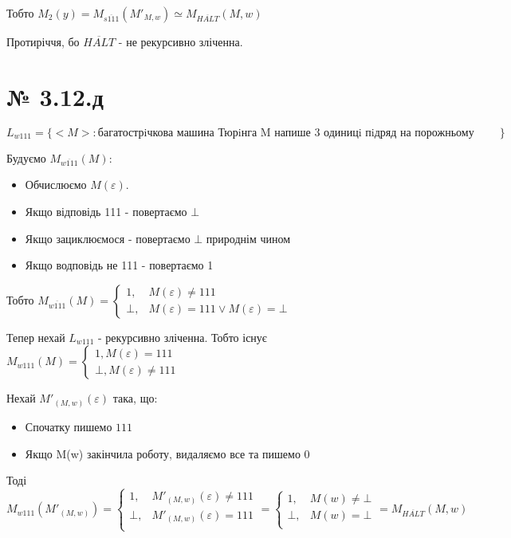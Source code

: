 \documentclass[11pt, a4paper]{article} %
\begin{document}
Тобто $M_2(y) = M_{\overline{s111}}(M'_{M,w}) \simeq M_{\overline{HALT}}(M, w)$

Протиріччя, бо $\overline{HALT}$ - не рекурсивно зліченна.

\section*{№ 3.12.д}
\begin{mdframed}
    $L_{w111} = \{<M> : \text{багатострiчкова машина Тюрiнга M напише 3 одиницi
    пiдряд на порожньому вхiдному словi}\}$
\end{mdframed}

Будуємо $M_{\overline{w111}}(M)$:
\begin{itemize}
    \item Обчислюємо $M(\varepsilon)$.
    \item Якщо відповідь 111 - повертаємо $\bot$
    \item Якщо зациклюємося - повертаємо $\bot$ природнім чином
    \item Якщо водповідь не 111 - повертаємо 1
\end{itemize}  

Тобто $M_{\overline{w111}}(M) = 
\begin{cases}
    1, & M(\varepsilon) \ne 111 \\
    \bot, & M(\varepsilon) = 111 \vee M(\varepsilon) = \bot
\end{cases}$

Тепер нехай $L_{w111}$ - рекурсивно зліченна. Тобто існує $M_{w111}(M) = \begin{cases}
    1, M(\varepsilon) = 111\\
    \bot, M(\varepsilon) \ne 111
\end{cases}$

Нехай $M'_{(M,w)}(\varepsilon)$ така, що:
\begin{itemize}
    \item Спочатку пишемо $111$
    \item Якщо M(w) закінчила роботу, видаляємо все та пишемо $0$
\end{itemize}

Тоді $M_{w111}(M'_{(M,w)}) = \begin{cases}
    1, & M'_{(M,w)}(\varepsilon) \ne 111 \\
    \bot, & M'_{(M,w)}(\varepsilon) = 111 \\
\end{cases} = \begin{cases}
    1, & M(w) \ne \bot \\
    \bot, & M(w) = \bot \\
\end{cases} = M_{\overline{HALT}}(M,w)$
\end{document}
